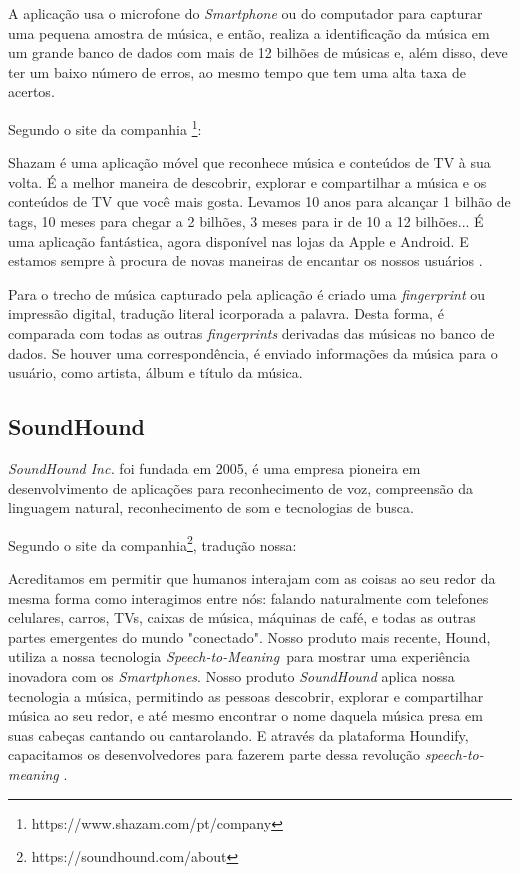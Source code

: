 A aplicação usa o microfone do \textit{Smartphone} ou do computador para capturar uma pequena amostra de música, e então, realiza a identificação da música em um grande banco de dados com mais de 12 bilhões de músicas e, além disso, deve ter um baixo número de erros, ao mesmo tempo que tem uma alta taxa de acertos.

Segundo o site da companhia \footnote{https://www.shazam.com/pt/company}:

\begin{citacao}
Shazam é uma aplicação móvel que reconhece música e conteúdos de TV à sua volta. É a melhor maneira de descobrir, explorar e compartilhar a música e os conteúdos de TV que você mais gosta. Levamos 10 anos para alcançar 1 bilhão de tags, 10 meses para chegar a 2 bilhões, 3 meses para ir de 10 a 12 bilhões... É uma aplicação fantástica, agora disponível nas lojas da Apple e Android. E estamos sempre à procura de novas maneiras de encantar os nossos usuários \cite{shazam2000}.
\end{citacao}

Para o trecho de música capturado pela aplicação é criado uma \textit{fingerprint} ou impressão digital, tradução literal icorporada a palavra. Desta forma, é comparada com todas as outras \textit{fingerprints} derivadas das músicas no banco de dados. Se houver uma correspondência, é enviado informações da música para o usuário, como artista, álbum e título da música.

\subsection{SoundHound}
\textit{SoundHound Inc.} foi fundada em 2005, é uma empresa pioneira em desenvolvimento de aplicações para reconhecimento de voz, compreensão da linguagem natural, reconhecimento de som e tecnologias de busca.

Segundo o site da companhia\footnote{https://soundhound.com/about}, tradução nossa:

\begin{citacao}
Acreditamos em permitir que humanos interajam com as coisas ao seu redor da mesma forma como interagimos entre nós: falando naturalmente com telefones celulares, carros, TVs, caixas de música, máquinas de café, e todas as outras partes emergentes do mundo "conectado". Nosso produto mais recente, Hound, utiliza a nossa tecnologia \textit{Speech-to-Meaning}\texttrademark\ para mostrar uma experiência inovadora com os \textit{Smartphones}. Nosso produto \textit{SoundHound} aplica nossa tecnologia a música, permitindo as pessoas descobrir, explorar e compartilhar música ao seu redor, e até mesmo encontrar o nome daquela música presa em suas cabeças cantando ou cantarolando. E através da plataforma Houndify, capacitamos os desenvolvedores para fazerem parte dessa revolução \textit{speech-to-meaning} \cite{soundhound2005}.
\end{citacao}

